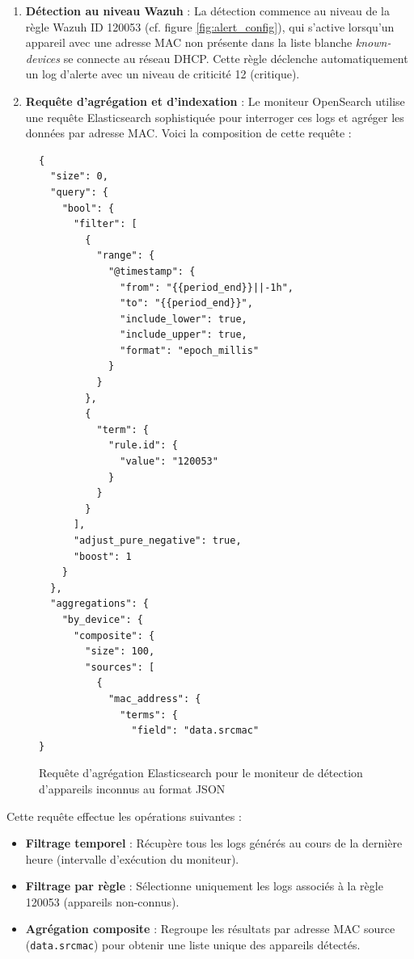 \documentclass[a4paper, 11pt]{article}
\begin{document}
\begin{enumerate}
  \item \textbf{Détection au niveau Wazuh} : La détection commence au niveau de la règle Wazuh ID 120053 (cf. figure \ref{fig:alert_config}), qui s'active lorsqu'un appareil avec une adresse MAC non présente dans la liste blanche \textit{known-devices} se connecte au réseau DHCP. Cette règle déclenche automatiquement un log d'alerte avec un niveau de criticité 12 (critique).
  \item \textbf{Requête d'agrégation et d'indexation} : Le moniteur OpenSearch utilise une requête Elasticsearch sophistiquée pour interroger ces logs et agréger les données par adresse MAC. Voici la composition de cette requête :
\end{enumerate}

\begin{figure}[H]
  \centering
  \begin{minipage}{0.9\textwidth}
\begin{lstlisting}[language=wazuhXML]
{
  "size": 0,
  "query": {
    "bool": {
      "filter": [
        {
          "range": {
            "@timestamp": {
              "from": "{{period_end}}||-1h",
              "to": "{{period_end}}",
              "include_lower": true,
              "include_upper": true,
              "format": "epoch_millis"
            }
          }
        },
        {
          "term": {
            "rule.id": {
              "value": "120053"
            }
          }
        }
      ],
      "adjust_pure_negative": true,
      "boost": 1
    }
  },
  "aggregations": {
    "by_device": {
      "composite": {
        "size": 100,
        "sources": [
          {
            "mac_address": {
              "terms": {
                "field": "data.srcmac"
}
\end{lstlisting}
    \caption{Requête d'agrégation Elasticsearch pour le moniteur de détection d'appareils inconnus au format JSON}
    \label{fig:elasticsearch_query}
  \end{minipage}
\end{figure}

Cette requête effectue les opérations suivantes :
\begin{itemize}
  \item[$\bullet$] \textbf{Filtrage temporel} : Récupère tous les logs générés au cours de la dernière heure (intervalle d'exécution du moniteur).
  \item[$\bullet$] \textbf{Filtrage par règle} : Sélectionne uniquement les logs associés à la règle 120053 (appareils non-connus).
  \item[$\bullet$] \textbf{Agrégation composite} : Regroupe les résultats par adresse MAC source (\texttt{data.srcmac}) pour obtenir une liste unique des appareils détectés.
\end{itemize}
\end{document}
